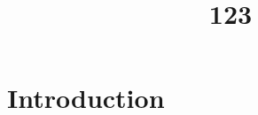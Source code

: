 \documentclass{mcmthesis}
\title{123}
\numberwithin{figure}{section}
\numberwithin{table}{section}
\numberwithin{equation}{section}
\begin{document}
\renewcommand{\algorithmicrequire}{\textbf{Input:}}  %
\renewcommand{\algorithmicensure}{\textbf{Output:}} %
\begin{abstract}



\begin{keywords}
\end{keywords}
\end{abstract}
\maketitle

\tableofcontents
  \thispagestyle{empty}
  \newpage
  \setcounter{page}{1}

\section{Introduction}
\end{document}
